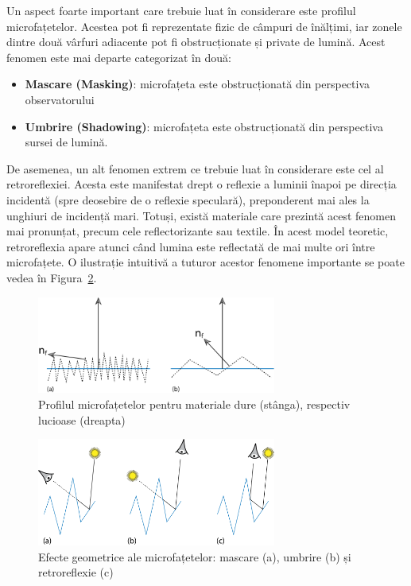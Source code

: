 \documentclass[12pt,a4paper]{report}
\numberwithin{equation}{section} %
\begin{document}
Un aspect foarte important care trebuie luat în considerare este profilul microfațetelor.
Acestea pot fi reprezentate fizic de câmpuri de înălțimi, iar zonele dintre două
vârfuri adiacente pot fi obstrucționate și private de lumină. Acest fenomen este
mai departe categorizat în două:

\begin{itemize}
	\item \textbf{Mascare (Masking)}: microfațeta este obstrucționată din perspectiva observatorului
	\item \textbf{Umbrire (Shadowing)}: microfațeta este obstrucționată din perspectiva sursei de lumină.
\end{itemize}

De asemenea, un alt fenomen extrem ce trebuie luat în considerare este cel al
retroreflexiei. Acesta este manifestat drept o reflexie a luminii înapoi pe direcția
incidentă (spre deosebire de o reflexie speculară), preponderent mai ales la unghiuri
de incidență mari. Totuși, există materiale care prezintă acest fenomen mai pronunțat,
precum cele reflectorizante sau textile.
În acest model teoretic, retroreflexia apare
atunci când lumina este reflectată de mai multe ori între microfațete. O ilustrație
intuitivă a tuturor acestor fenomene importante se poate vedea în Figura~\ref{fig:microfacet_effects}.

\begin{figure}[ht]
	\centering
	\includegraphics[width=0.7\textwidth]{pics/microfacet.png}
	\caption{Profilul microfațetelor pentru materiale dure (stânga), respectiv lucioase (dreapta)\protect{}}
	\label{fig:microfacet}
\end{figure}

\begin{figure}[ht]
	\centering
	\includegraphics[width=0.7\textwidth]{pics/microfacet_effects.png}
	\caption{Efecte geometrice ale microfațetelor: mascare (a), umbrire (b) și retroreflexie (c)\protect{}}
	\label{fig:microfacet_effects}
\end{figure}
\end{document}
